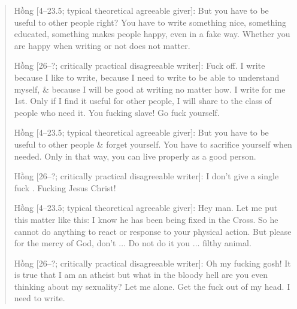 \documentclass[12pt]{article}
\begin{document}
\begin{quote}
	{\sf Hồng [4--23.5; typical theoretical agreeable giver]}: But you have to be useful to other people right? You have to write something nice, something educated, something makes people happy, even in a fake way. Whether you are happy when writing or not does not matter.
	
	{\sf Hồng [26--?; critically practical disagreeable writer]}: Fuck off. I write because I like to write, because I need to write to be able to understand myself, \& because I will be good at writing no matter how. I write for me 1st. Only if I find it useful for other people, I will share to the class of people who need it. You fucking slave! Go fuck yourself.
	
	{\sf Hồng [4--23.5; typical theoretical agreeable giver]}: But you have to be useful to other people \& forget yourself. You have to sacrifice yourself when needed. Only in that way, you can live properly as a good person.
	
	{\sf Hồng [26--?; critically practical disagreeable writer]}: I don't give a single fuck \cite{Manson_giving_fuck,Manson_giving_fuck_vn}. Fucking Jesus Christ!
	
	{\sf Hồng [4--23.5; typical theoretical agreeable giver]}: Hey man. Let me put this matter like this: I know he has been being fixed in the Cross. So he cannot do anything to react or response to your physical action. But please for the mercy of God, don't $\ldots$ Do not do it you $\ldots$ filthy animal.
	
	{\sf Hồng [26--?; critically practical disagreeable writer]}: Oh my fucking gosh! It is true that I am an atheist but what in the bloody hell are you even thinking about my sexuality? Let me alone. Get the fuck out of my head. I need to write.
\end{quote}
\end{document}
